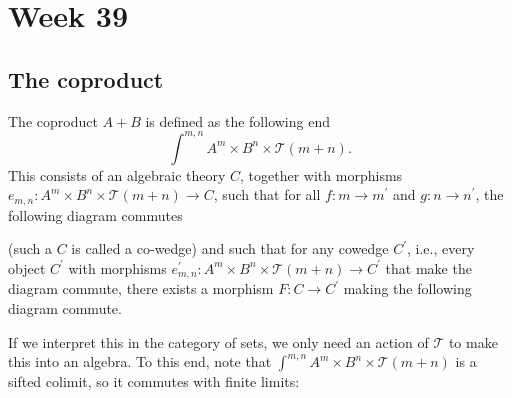 \documentclass{amsbook}
\newcommand{\id}[1]{\ensuremath{\text{id}_{#1}}}
\theoremstyle{definition}
\begin{document}
  \chapter*{Week 39}

  \section{The coproduct}
  The coproduct $ A + B $ is defined as the following end
  \[ \int^{m, n} A^m \times B^n \times \mathcal T(m + n). \]
  This consists of an algebraic theory $ C $, together with morphisms $ e_{m, n}: A^m \times B^n \times \mathcal T(m + n) \to C $, such that for all $ f: m \to m^\prime $ and $ g: n \to n^\prime $, the following diagram commutes
  \begin{center}
  \end{center}
  (such a $ C $ is called a co-wedge) and such that for any cowedge $ C^\prime $, i.e., every object $ C^\prime $ with morphisms $ e^\prime_{m, n}: A^m \times B^n \times \mathcal T(m + n) \to C^\prime $ that make the diagram commute, there exists a morphism $ F : C \to C^\prime $ making the following diagram commute.
  \begin{center}
  \end{center}
  If we interpret this in the category of sets, we only need an action of $ \mathcal T $ to make this into an algebra. To this end, note that $ \int^{m, n} A^m \times B^n \times \mathcal T(m + n) $ is a sifted colimit, so it commutes with finite limits:
\end{document}
